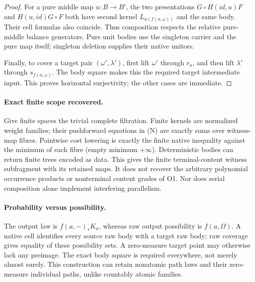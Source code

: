\documentclass[11pt]{article}
\begin{document}
\begin{proof}
For a pure middle map $u:B\to B'$, the two presentations $G\circ H(id,u)F$ and $H(u,id)G\circ F$ both have second kernel $L_{u(f(a,\omega))}$ and the same body. Their cell formulas also coincide. Thus composition respects the relative pure-middle balance generators. Pure unit bodies use the singleton carrier and the pure map itself; singleton deletion supplies their native unitors.

Finally, to cover a target pair $(\omega',\lambda')$, first lift $\omega'$ through $r_a$, and then lift $\lambda'$ through $s_{f(a,\omega)}$. The body square makes this the required target intermediate input. This proves horizontal surjectivity; the other cases are immediate.
\end{proof}

\paragraph{Exact finite scope recovered.} Give finite spaces the trivial complete filtration. Finite kernels are normalized weight families; their pushforward equations in (N) are exactly sums over witness-map fibres. Pointwise cost lowering is exactly the finite native inequality against the minimum of each fibre (empty minimum $+\infty$). Deterministic bodies can return finite trees encoded as data. This gives the finite terminal-content witness subfragment with its retained maps. It does not recover the arbitrary polynomial occurrence products or nonterminal content grades of O1. Nor does serial composition alone implement interfering parallelism.

\paragraph{Probability versus possibility.} The output law is $f(a,-)_*K_a$, whereas raw output possibility is $f(a,\Omega)$. A native cell identifies every source raw body with a target raw body; raw coverage gives equality of these possibility sets. A zero-measure target point may otherwise lack any preimage. The exact body square is required everywhere, not merely almost surely. This construction can retain nonatomic path laws and their zero-measure individual paths, unlike countably atomic families.
\end{document}
